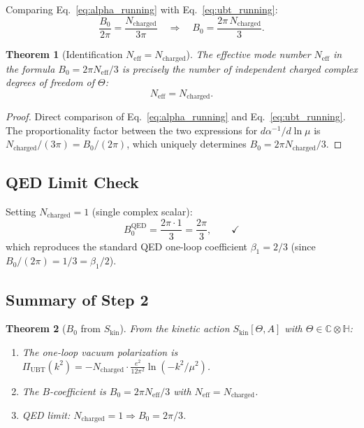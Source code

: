 \documentclass[11pt,a4paper]{article}
\newcommand{\C}{\mathbb{C}}
\renewcommand{\H}{\mathbb{H}}
\newtheorem{theorem}{Theorem}
\theoremstyle{remark}
\begin{document}
Comparing Eq.~\eqref{eq:alpha_running} with Eq.~\eqref{eq:ubt_running}:
\begin{equation}
  \frac{B_0}{2\pi} = \frac{N_{\mathrm{charged}}}{3\pi}
  \quad\Longrightarrow\quad
  \boxed{B_0 = \frac{2\pi\,N_{\mathrm{charged}}}{3}.}
  \label{eq:B0_Ncharged}
\end{equation}

\begin{theorem}[Identification $N_{\mathrm{eff}} = N_{\mathrm{charged}}$]
\label{thm:Neff_equals_Ncharged}
The effective mode number $N_{\mathrm{eff}}$ in the formula $B_0 = 2\pi N_{\mathrm{eff}}/3$
is precisely the number of independent charged complex degrees of freedom of $\Theta$:
\begin{equation}
  N_{\mathrm{eff}} = N_{\mathrm{charged}}.
\end{equation}
\end{theorem}

\begin{proof}
Direct comparison of Eq.~\eqref{eq:alpha_running} and Eq.~\eqref{eq:ubt_running}.
The proportionality factor between the two expressions for $d\alpha^{-1}/d\ln\mu$ is
$N_{\mathrm{charged}}/(3\pi) = B_0/(2\pi)$, which uniquely determines $B_0 = 2\pi N_{\mathrm{charged}}/3$.
\end{proof}

\subsection{QED Limit Check}

Setting $N_{\mathrm{charged}} = 1$ (single complex scalar):
\begin{equation}
  B_0^{\mathrm{QED}} = \frac{2\pi \cdot 1}{3} = \frac{2\pi}{3}, \qquad \checkmark
  \label{eq:qed_limit_B0}
\end{equation}
which reproduces the standard QED one-loop coefficient $\beta_1 = 2/3$ (since
$B_0/(2\pi) = 1/3 = \beta_1/2$). \checkmark

\subsection{Summary of Step 2}

\begin{theorem}[$B_0$ from $S_{\mathrm{kin}}$]
\label{thm:B0_from_Skin}
From the kinetic action $S_{\mathrm{kin}}[\Theta, A]$ with $\Theta \in \C \otimes \H$:
\begin{enumerate}
  \item[(i)] The one-loop vacuum polarization is
    $\Pi_{\mathrm{UBT}}(k^2) = -N_{\mathrm{charged}} \cdot \frac{e^2}{12\pi^2}\ln(-k^2/\mu^2)$.
  \item[(ii)] The $B$-coefficient is $B_0 = 2\pi N_{\mathrm{eff}}/3$ with
    $N_{\mathrm{eff}} = N_{\mathrm{charged}}$.
  \item[(iii)] QED limit: $N_{\mathrm{charged}} = 1 \Rightarrow B_0 = 2\pi/3$. \checkmark
\end{enumerate}
\end{theorem}
\end{document}
